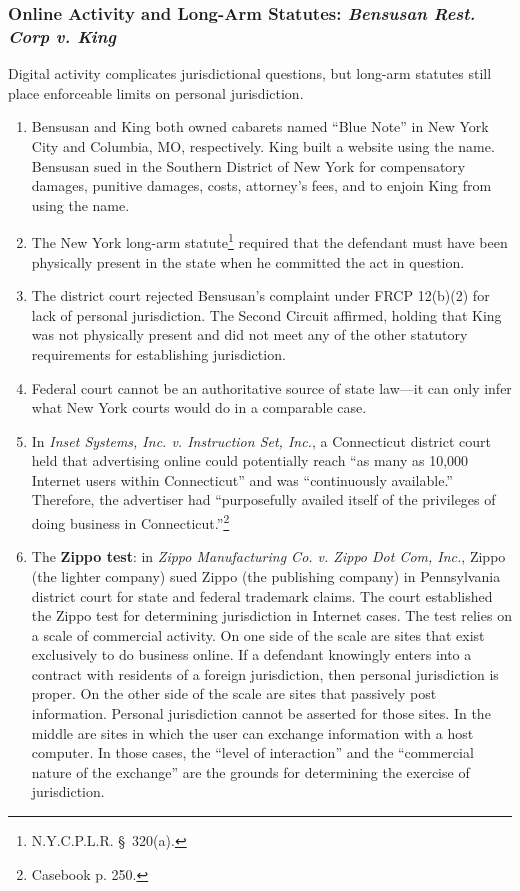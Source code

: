 \subsubsection{Online Activity and Long-Arm Statutes: \emph{Bensusan Rest. 
Corp v. King}}

Digital activity complicates jurisdictional questions, but long-arm statutes 
still place enforceable limits on personal jurisdiction.

\begin{enumerate}
    \item Bensusan and King both owned cabarets named ``Blue Note'' in New 
    York City and Columbia, MO, respectively. King built a website using the 
    name. Bensusan sued in the Southern District of New York for compensatory 
    damages, punitive damages, costs, attorney's fees, and to enjoin King from 
    using the name.
    \item The New York long-arm statute\footnote{N.Y.C.P.L.R. \S\ 320(a).} 
    required that the defendant must have been physically present in the state 
    when he committed the act in question.
    \item The district court rejected Bensusan's complaint under FRCP 12(b)(2) 
    for lack of personal jurisdiction. The Second Circuit affirmed, holding
    that King was not physically present and did not meet any of the other 
    statutory requirements for establishing jurisdiction.
    \item Federal court cannot be an authoritative source of state law---it 
    can only infer what New York courts would do in a comparable case.
    \item In \emph{Inset Systems, Inc. v. Instruction Set, Inc.}, a 
    Connecticut district court held that advertising online could potentially 
    reach ``as many as 10,000 Internet users within Connecticut'' and was 
    ``continuously available.'' Therefore, the advertiser had ``purposefully 
    availed itself of the privileges of doing business in 
    Connecticut.''\footnote{Casebook p. 250.}
    \item The \textbf{Zippo test}: in \emph{Zippo Manufacturing Co. v. Zippo 
    Dot Com, Inc.}, Zippo (the lighter company) sued Zippo (the publishing 
    company) in Pennsylvania district court for state and federal trademark 
    claims. The court established the Zippo test for determining jurisdiction 
    in Internet cases. The test relies on a scale of commercial activity. On 
    one side of the scale are sites that exist exclusively to do business 
    online.  If a defendant knowingly enters into a contract with residents of 
    a foreign jurisdiction, then personal jurisdiction is proper. On the other 
    side of the scale are sites that passively post information. Personal 
    jurisdiction cannot be asserted for those sites. In the middle are sites 
    in which the user can exchange information with a host computer. In those 
    cases, the ``level of interaction'' and the ``commercial nature of the 
    exchange'' are the grounds for determining the exercise of jurisdiction.  
    \end{enumerate}

